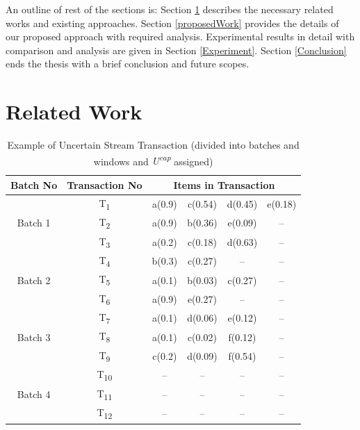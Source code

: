 \documentclass[conference]{IEEEtran}
\begin{document}
An outline of rest of the sections is: Section \ref{Related_work} describes the necessary related works and existing approaches. Section \ref{proposedWork} provides the details of our proposed approach with required analysis. Experimental results in detail with comparison and analysis are given in Section \ref{Experiment}. Section \ref{Conclusion} ends the thesis with a brief conclusion and future scopes.

\section{Related Work}\label{Related_work}
\begin{table}
\centering

\begin{tabular}{|c|c|c|c|c|c|}
\hline
	Batch No& Transaction No & \multicolumn{4}{c|}{Items in Transaction} \\ \hline \hline
	\multirow{3}{*}{Batch 1}	&	T\textsubscript{1} & a(0.9) & c(0.54) & d(0.45) & e(0.18)		\\
								&	T\textsubscript{2} & a(0.9) & b(0.36) & e(0.09) & --			\\
								&	T\textsubscript{3} & a(0.2) & c(0.18) & d(0.63) & --			\\\hline
	\multirow{3}{*}{Batch 2}	&	T\textsubscript{4} & b(0.3) & c(0.27) & --  	& --			\\
								&	T\textsubscript{5} & a(0.1) & b(0.03) & c(0.27) & --  			\\
								&	T\textsubscript{6} & a(0.9) & e(0.27) & --	    & --  			\\\hline
	\multirow{3}{*}{Batch 3}	&	T\textsubscript{7} & a(0.1) & d(0.06) & e(0.12) & --			\\
								&	T\textsubscript{8} & a(0.1) & c(0.02) & f(0.12) & --   			\\
								&	T\textsubscript{9} & c(0.2) & d(0.09) & f(0.54) & --   			\\\hline
								
	\multirow{3}{*}{Batch 4}	&	T\textsubscript{10} &  --  &  --  &  --  & --    				\\
								&	T\textsubscript{11} &  --  &  --  &  --  & --    				\\
								&	T\textsubscript{12} &  --  &  --  &  --  & --    				\\\hline
	\end{tabular}
\caption{Example of Uncertain Stream Transaction (divided into batches and windows and \emph{U\textsuperscript{cap}} assigned)}
\label{table:prefix_assigned}
\end{table}
\end{document}
